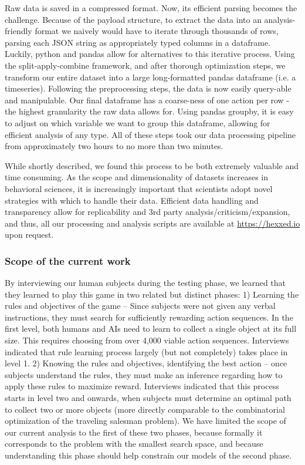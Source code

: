 \documentclass[11pt]{article}
\begin{document}
Raw data is saved in a compressed format. Now, its efficient parsing becomes the challenge. Because of the payload structure, to extract the data into an analysis-friendly format we naively would have to iterate through thousands of rows, parsing each JSON string as appropriately typed columns in a dataframe. Luckily, python and pandas allow for alternatives to this iterative process. Using the split-apply-combine \cite{wickham2011split} framework, and after thorough optimization steps, we transform our entire dataset into a large long-formatted pandas dataframe (i.e. a timeseries). Following the preprocessing steps, the data is now easily query-able and manipulable.
Our final dataframe has a coarse-ness of one action per row - the highest granularity the raw data allows for. Using pandas groupby, it is easy to adjust on which variable we want to group this dataframe, allowing for efficient analysis of any type. All of these steps took our data processing pipeline from approximately two hours to no more than two minutes.

While shortly described, we found this process to be both extremely valuable and time consuming. As the scope and dimensionality of datasets increases in behavioral sciences, it is increasingly important that scientists adopt novel strategies with which to handle their data. Efficient data handling and transparency allow for replicability and 3rd party analysis/criticism/expansion, and thus, all our processing and analysis scripts are available at \url{https://hexxed.io} upon request.



\subsubsection{Scope of the current work}

By interviewing our human subjects during the testing phase, we learned that they learned to play this game in two related but distinct phases: 1) Learning the rules and objectives of the game – Since subjects were not given any verbal instructions, they must search for sufficiently rewarding action sequences. In the first level, both humans and AIs need to learn to collect a single object at its full size. This requires choosing from over 4,000 viable action sequences. Interviews indicated that rule learning process largely (but not completely) takes place in level 1. 2) Knowing the rules and objectives, identifying the best action – once subjects understand the rules, they must make an inference regarding how to apply these rules to maximize reward. Interviews indicated that this process starts in level two and onwards, when subjects must determine an optimal path to collect two or more objects (more directly comparable to the combinatorial optimization of the traveling salesman problem). We have limited the scope of our current analysis to the first of these two phases, because formally it corresponds to the problem with the smallest search space, and because understanding this phase should help constrain our models of the second phase.
\end{document}

